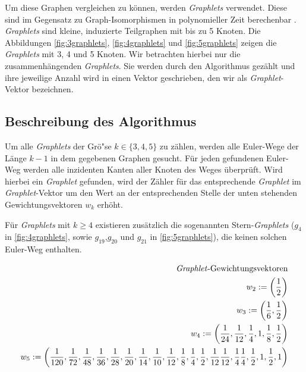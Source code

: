 \documentclass{report}
\begin{document}
Um diese Graphen vergleichen zu k\"onnen, werden \textit{Graphlets} verwendet. Diese sind im Gegensatz zu Graph-Isomorphismen in polynomieller Zeit berechenbar \cite{sherv_graphlets}. \textit{Graphlets} sind kleine, induzierte Teilgraphen mit bis zu 5 Knoten. Die Abbildungen \ref{fig:3graphlets}, \ref{fig:4graphlets} und \ref{fig:5graphlets} zeigen die \textit{Graphlets} mit 3, 4 und 5 Knoten. Wir betrachten hierbei nur die zusammenh\"angenden \textit{Graphlets}. Sie werden durch den Algorithmus gez\"ahlt und ihre jeweilige Anzahl wird in einen Vektor geschrieben, den wir als \textit{Graphlet}-Vektor bezeichnen.


\subsection{Beschreibung des Algorithmus}
Um alle \textit{Graphlets} der Gr\"o"se $k \in \{3,4,5\}$ zu z\"ahlen, werden alle Euler-Wege der L\"ange $k-1$ in dem gegebenen Graphen gesucht. F\"ur jeden gefundenen Euler-Weg werden alle inzidenten Kanten aller Knoten des Weges \"uberpr\"uft. Wird hierbei ein \textit{Graphlet} gefunden, wird der Z\"ahler f\"ur das entsprechende \textit{Graphlet} im \textit{Graphlet}-Vektor um den Wert an der entsprechenden Stelle der unten stehenden Gewichtungsvektoren $w_k$ erh\"oht.


F\"ur \textit{Graphlets} mit $k \geq 4$ existieren zus\"atzlich die sogenannten Stern-\textit{Graphlets} ($g_4$ in \ref{fig:4graphlets}, sowie $g_{19}$,$g_{20}$ und $g_{21}$ in \ref{fig:5graphlets}), die keinen solchen Euler-Weg enthalten.

\begin{subequations}
\label{eq:w-vector}
\begin{align}
\text{\textit{Graphlet}-Gewichtungsvektoren} \\
w_2 := \left( \frac{1}{2} \right) \\
w_3 := \left( \frac{1}{6}, \frac{1}{2} \right) \\
w_4 := \left( \frac{1}{24}, \frac{1}{12}, \frac{1}{4}, 1, \frac{1}{8},\frac{1}{2} \right) \\
w_5 := \left( \frac{1}{120}, \frac{1}{72}, \frac{1}{48}, \frac{1}{36}, \frac{1}{28}, \frac{1}{20}, \frac{1}{14}, \frac{1}{10}, \frac{1}{12}, \frac{1}{8}, \frac{1}{4}, \frac{1}{2}, \frac{1}{12} \frac{1}{12}, \frac{1}{4} \frac{1}{4}, \frac{1}{2}, 1, \frac{1}{2}, 1\right)
\end{align}
\end{subequations}
\end{document}
